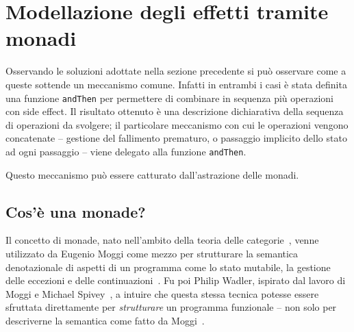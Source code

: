 \section{Modellazione degli effetti tramite monadi}
Osservando le soluzioni adottate nella sezione precedente si può osservare come a queste sottende un meccanismo comune. Infatti in entrambi i casi è stata definita una funzione \lstinline{andThen} per permettere di combinare in sequenza più operazioni con side effect. Il risultato ottenuto è una descrizione dichiarativa della sequenza di operazioni da svolgere; il particolare meccanismo con cui le operazioni vengono concatenate -- gestione del fallimento prematuro, o passaggio implicito dello stato ad ogni passaggio -- viene delegato alla funzione \lstinline{andThen}.

Questo meccanismo può essere catturato dall'astrazione delle monadi.

\subsection{Cos'è una monade?}
\label{cos-e-una-monade}
Il concetto di monade, nato nell'ambito della teoria delle categorie~\cite{cit:categories-for-the-working-mathematician}, venne utilizzato da Eugenio Moggi come mezzo per strutturare la semantica denotazionale di aspetti di un programma come lo stato mutabile, la gestione delle eccezioni e delle continuazioni~\cite{cit:an-abstract-view-of-programming-languages}.
Fu poi Philip Wadler, ispirato dal lavoro di Moggi e Michael Spivey~\cite{cit:a-functional-theory-of-exceptions}, a intuire che questa stessa tecnica potesse essere sfruttata direttamente per \emph{strutturare} un programma funzionale -- non solo per descriverne la semantica come fatto da Moggi~\cite{cit:comprehending-monads,cit:the-essence-of-functional-programming}.


